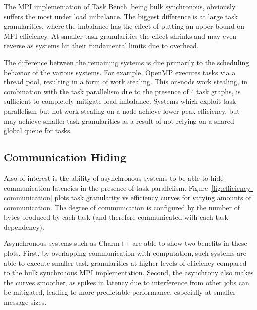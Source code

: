 The MPI implementation of Task Bench, being bulk synchronous,
obviously suffers the most under load imbalance. The biggest
difference is at large task granularities, where the imbalance has the
effect of putting an upper bound on MPI efficiency. At smaller task
granularities the effect shrinks and may even reverse as systems hit
their fundamental limits due to overhead.

The difference between the remaining systems is due primarily to the
scheduling behavior of the various systems. For example, OpenMP
executes tasks via a thread pool, resulting in a form of work
stealing. This on-node work stealing, in combination with the task
parallelism due to the presence of 4 task graphs, is sufficient to
completely mitigate load imbalance. Systems which exploit task
parallelism but not work stealing on a node achieve lower peak
efficiency, but may achieve smaller task granularities as a result of
not relying on a shared global queue for tasks.

\subsection{Communication Hiding}



Also of interest is the ability of asynchronous systems to be able to
hide communication latencies in the presence of task
parallelism. Figure~\ref{fig:efficiency-communication} plots task
granularity vs efficiency curves for varying amounts of
communication. The degree of communication is configured by the number
of bytes produced by each task (and therefore communicated with each
task dependency).

Asynchronous systems such as Charm++ are able to show two benefits in
these plots. First, by overlapping communication with computation,
such systems are able to execute smaller task granularities at higher
levels of efficiency compared to the bulk synchronous MPI
implementation. Second, the asynchrony also makes the curves smoother,
as spikes in latency due to interference from other jobs can be
mitigated, leading to more predictable performance, especially at
smaller message sizes.
